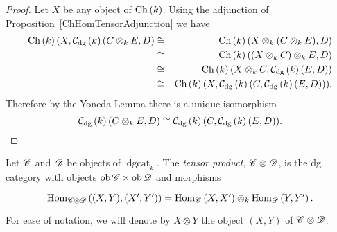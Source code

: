 \documentclass[dissertation.tex]{subfiles}
\begin{document}
\begin{eg}
\begin{description}[style=nextline]
\begin{prop}
              \begin{proof}
                Let $X$ be any object of $\operatorname{Ch}\left(k\right)$.
                Using the adjunction of Proposition~\ref{ChHomTensorAdjunction} we have
                \begin{eqnarray*}
                  \operatorname{Ch}\left(k\right)(X,\mathcal{C}_\text{dg}\left(k\right)(C \otimes_k E, D) &\cong& 
                  \operatorname{Ch}\left(k\right)(X \otimes_k (C \otimes_k E), D)\\
                  &\cong& \operatorname{Ch}\left(k\right)((X \otimes_k C) \otimes_k E, D)\\
                  &\cong& \operatorname{Ch}\left(k\right)(X \otimes_k C, \mathcal{C}_\text{dg}\left(k\right)(E,D))\\
                  &\cong& \operatorname{Ch}\left(k\right)(X, \mathcal{C}_\text{dg}\left(k\right)(C, \mathcal{C}_\text{dg}\left(k\right)(E,D))).
                \end{eqnarray*}
                Therefore by the Yoneda Lemma there is a unique isomorphism 
                $$\mathcal{C}_\text{dg}\left(k\right)(C \otimes_k E, D) \cong \mathcal{C}_\text{dg}\left(k\right)(C, \mathcal{C}_\text{dg}\left(k\right)(E,D)).$$
              \end{proof}
            \end{prop}
          \end{description}
        \end{eg}

        \begin{defn}
          Let $\mathscr{C}$ and $\mathscr{D}$ be objects of $\operatorname{dgcat}_k$.
          The {\it tensor product}, $\mathscr{C} \otimes \mathscr{D}$, is the dg category with objects $\operatorname{ob}\mathscr{C} \times \operatorname{ob}\mathscr{D}$ and
          morphisms
          $$\begin{tikzcd}
            \Hom{\CC \otimes \D}{(X, Y), (X^\prime, Y^\prime)} = \Hom{\CC}{X,X^\prime} \otimes_k \Hom{\D}{Y,Y^\prime}.
          \end{tikzcd}$$
          For ease of notation, we will denote by $X \otimes Y$ the object $(X,Y)$ of $\mathscr{C} \otimes \mathscr{D}$.
        \end{defn}
\end{document}
